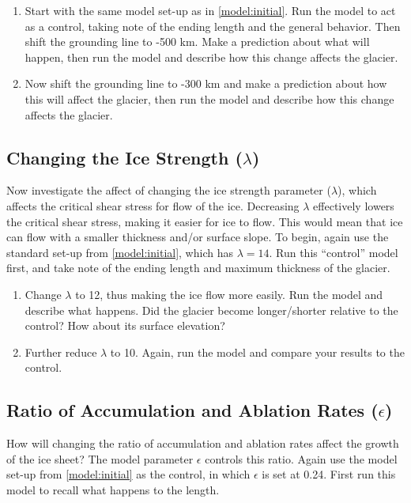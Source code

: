 \documentclass[11pt,letterpaper]{article}
\begin{document}
\begin{enumerate}[label=(\alph*)]
\item Start with the same model set-up as in \ref{model:initial}. Run the model to act as a control, taking note of the ending length and the general behavior. Then shift the grounding line to -500 km.  Make a prediction about what will happen, then run the model and describe how this change affects the glacier.

\item Now shift the grounding line to -300 km and make a prediction about how this will affect the glacier, then run the model and describe how this change affects the glacier.
\end{enumerate}

\subsection{Changing the Ice Strength ($\lambda$)}

Now investigate the affect of changing the ice strength parameter ($\lambda$), which affects the critical shear stress for flow of the ice. Decreasing $\lambda$ effectively lowers the critical shear stress, making it easier for ice to flow. This would mean that ice can flow with a smaller thickness and/or surface slope. To begin, again use the standard set-up from \ref{model:initial}, which has $\lambda=14$. Run this ``control'' model first, and take note of the ending length and maximum thickness of the glacier. 

\begin{enumerate}[label=(\alph*)]
\item Change $\lambda$ to 12, thus making the ice flow more easily. Run the model and describe what happens. Did the glacier become longer/shorter relative to the control? How about its surface elevation?

\item Further reduce $\lambda$ to 10. Again, run the model and compare your results to the control.
\end{enumerate}


\subsection{Ratio of Accumulation and Ablation Rates ($\epsilon$)}

How will changing the ratio of accumulation and ablation rates affect the growth of the ice sheet?  The model parameter $\epsilon$ controls this ratio.  Again use the model set-up from \ref{model:initial} as the control, in which $\epsilon$ is set at 0.24. First run this model to recall what happens to the length. 
\end{document}

